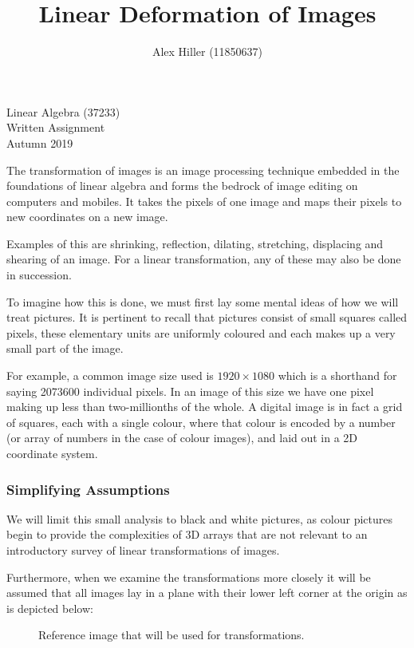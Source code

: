 \documentclass{article}
\author{Alex Hiller (11850637)}
\title{Linear Deformation of Images}
\begin{document}
\maketitle
\vspace{20mm}
\begin{center} {Linear Algebra (37233)\\ Written Assignment\\ Autumn 2019} \end{center}
\clearpage

The transformation of images is an image processing technique embedded in the
foundations of linear algebra and forms the bedrock of image editing on
computers and mobiles. It takes the pixels of one image and maps their
pixels to new coordinates on a new image.

Examples of this are shrinking, reflection, dilating, stretching, displacing and
shearing of an image. For a linear transformation, any of these may also be done
in succession.

To imagine how this is done, we must first lay some mental ideas of how we will
treat pictures. It is pertinent to recall that pictures consist of small squares
called pixels, these elementary units are uniformly coloured and each makes
up a very small part of the image. 

For example, a common image size used is $ 1920 \times 1080 $ which is a 
shorthand for saying 2073600 individual pixels. In an image of this size we have
one pixel making up less than two-millionths of the whole.
A digital image is in fact a grid of squares, each with a single 
colour, where that colour is encoded by a number (or array of numbers in 
the case of colour images), and laid out in a 2D coordinate system.

\subsubsection{Simplifying Assumptions} 

We will limit this small analysis to black and white pictures, as colour pictures
begin to provide the complexities of 3D arrays that are not relevant to an 
introductory survey of linear transformations of images.

Furthermore, when we examine the transformations more closely it will be assumed
that all images lay in a plane with their lower left corner at the origin as 
is depicted below:

\begin{figure}[!htbp]
    \centering
    \caption{Reference image that will be used for transformations.}
\end{figure}
\end{document}
